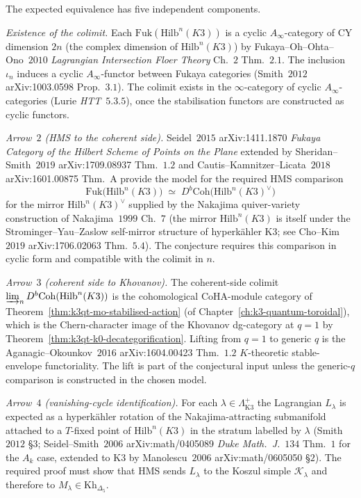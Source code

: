 \begin{remark}
The expected equivalence has five independent components.

\emph{Existence of the colimit.} Each
$\mathrm{Fuk}(\mathrm{Hilb}^n(K3))$ is a cyclic $A_\infty$-category
of CY dimension $2n$ (the complex dimension of $\mathrm{Hilb}^n(K3)$)
by Fukaya--Oh--Ohta--Ono~$2010$ \emph{Lagrangian Intersection Floer
Theory} Ch.~$2$ Thm.~$2.1$. The inclusion
$\iota_n$ induces a cyclic $A_\infty$-functor between Fukaya
categories (Smith~$2012$ arXiv:1003.0598 Prop.\ $3.1$).
The colimit exists in the $\infty$-category of cyclic
$A_\infty$-categories (Lurie \emph{HTT}~$5.3.5$), once the
stabilisation functors are constructed as cyclic functors.

\emph{Arrow~$2$ (HMS to the coherent side).} Seidel~$2015$ arXiv:1411.1870
\emph{Fukaya Category of the Hilbert Scheme of Points on the
Plane} extended by Sheridan--Smith~$2019$ arXiv:1709.08937 Thm.\ $1.2$
and Cautis--Kamnitzer--Licata~$2018$ arXiv:1601.00875 Thm.\ A
provide the model for the required HMS comparison
\[
 \mathrm{Fuk}\bigl(\mathrm{Hilb}^n(K3)\bigr)
 \;\simeq\;
 D^b\mathrm{Coh}\bigl(\mathrm{Hilb}^n(K3)^\vee\bigr)
\]
for the mirror $\mathrm{Hilb}^n(K3)^\vee$ supplied by the Nakajima
quiver-variety construction of
Nakajima~$1999$ Ch.~$7$ (the mirror $\mathrm{Hilb}^n(K3)$ is itself
under the Strominger--Yau--Zaslow self-mirror structure of
hyperk\"ahler K3; see Cho--Kim~$2019$ arXiv:1706.02063 Thm.\ $5.4$).
The conjecture requires this comparison in cyclic form and
compatible with the colimit in $n$.

\emph{Arrow~$3$ (coherent side to Khovanov).} The coherent-side colimit
$\varinjlim_n D^b\mathrm{Coh}(\mathrm{Hilb}^n(K3))$ is the
cohomological CoHA-module category of
Theorem~\ref{thm:k3qt-mo-stabilised-action}
(of Chapter~\ref{ch:k3-quantum-toroidal}), which is the
Chern-character image of the Khovanov dg-category at $q = 1$ by
Theorem~\ref{thm:k3qt-k0-decategorification}. Lifting from $q = 1$
to generic $q$ is the Aganagic--Okounkov~$2016$ arXiv:1604.00423
Thm.\ $1.2$ $K$-theoretic stable-envelope functoriality. The lift is
part of the conjectural input unless the generic-$q$ comparison is
constructed in the chosen model.

\emph{Arrow~$4$ (vanishing-cycle identification).} For each
$\lambda\in\Lambda_{\mathrm{K3}}^+$ the Lagrangian $L_\lambda$ is
expected as a hyperk\"ahler rotation of the Nakajima-attracting
submanifold attached to a $T$-fixed point of
$\mathrm{Hilb}^n(K3)$ in the stratum labelled by $\lambda$
(Smith~$2012$ \S $3$; Seidel--Smith~$2006$ arXiv:math/0405089
\emph{Duke Math.\ J.}~$134$ Thm.\ $1$ for the $A_k$ case,
extended to K3 by Manolescu~$2006$ arXiv:math/0605050 \S $2$).
The required proof must show that HMS sends $L_\lambda$ to the
Koszul simple $\mathcal K_\lambda$ and therefore to
$M_\lambda\in\mathrm{Kh}_{\Delta_5}$.


\end{remark}
